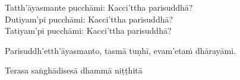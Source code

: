 \begin{center}
	\smallskip

	Tatth'āyasmante pucchāmi: Kacci'ttha parisuddhā?\\
	Dutiyam'pi pucchāmi: Kacci'ttha parisuddhā?\\
	Tatiyam'pi pucchāmi: Kacci'ttha parisuddhā?

	\smallskip

	Parisuddh'etth'āyasmanto, tasmā tuṇhī, evam'etaṁ dhārayāmi.
\end{center}

\begin{outro}
	Terasa saṅghādisesā dhammā niṭṭhitā\makeatletter\hyperlink{endnote11-appendix}\makeatother
        \end{outro}

\clearpage

